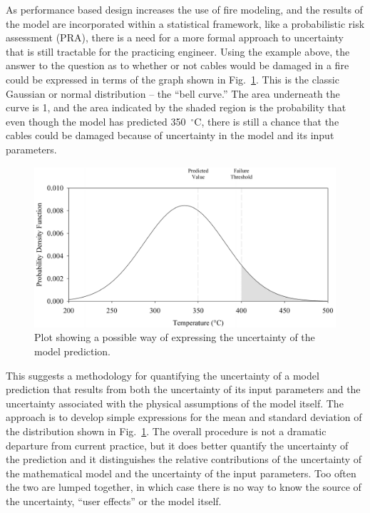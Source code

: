 As performance based design increases the use of fire modeling, and the results of the model are incorporated within a statistical framework,
like a probabilistic risk assessment (PRA), there is a need for a more formal approach to uncertainty that is still tractable for the practicing
engineer. Using the example above, the answer to the question as to whether or not cables would be damaged in a fire could be expressed in terms of
the graph shown in Fig.~\ref{bell_curve}. This is the classic Gaussian or normal distribution -- the ``bell curve.'' The area underneath the curve is 1, and
the area indicated by the shaded region is the probability that even though the model has predicted 350~$^\circ$C, there is still a chance that
the cables could be damaged because of uncertainty in the model and its input parameters.
\begin{figure}[t]
\begin{center}
\includegraphics[width=5.in]{FIGURES/bell_curve}
\end{center}
\caption[Demonstration of model uncertainty.]{Plot showing a possible way of expressing the uncertainty of the model prediction.}
\label{bell_curve}
\end{figure}

This \paper suggests a methodology for quantifying the uncertainty of a model prediction that results from both the uncertainty of
its input parameters and the uncertainty associated with the physical assumptions of the model itself.
The approach is to develop simple expressions for the mean and standard deviation of the distribution shown in
Fig.~\ref{bell_curve}. The overall procedure is not a dramatic departure from current
practice, but it does better quantify the uncertainty of the prediction and it distinguishes the relative contributions of
the uncertainty of the mathematical model and the uncertainty of the input parameters.
Too often the two are lumped together, in which case there is no way to know
the source of the uncertainty, ``user effects'' or the model itself.



